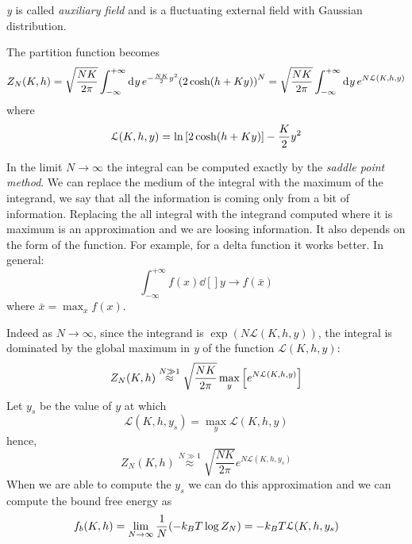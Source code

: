 \documentclass[../main/main.tex]{subfiles}
\begin{document}
\begin{remark}
\emph{y} is called \emph{auxiliary field} and is a fluctuating external field  with Gaussian distribution.
\end{remark}
The partition function becomes
\begin{equation}
Z_N (K,h) = \sqrt{\frac{N K}{2 \pi }} \int_{- \infty }^{+ \infty } \dd[]{y} e^{- \frac{NK}{2}y^2} \qty(2 \cosh(h+Ky))^N = \sqrt{\frac{N K}{2 \pi }} \int_{-\infty }^{+\infty } \dd[]{y} e^{N \mathcal{L} (K,h,y)}
\end{equation}
where
\begin{equation}
  \mathcal{L} (K,h,y) = \ln{\qty[2 \cosh(h+Ky)] } - \frac{K}{2}y^2
\end{equation}

\begin{remark}
In the limit \( N \rightarrow \infty  \) the integral can be computed exactly by the \emph{saddle point method}.
We can replace the medium of the integral with the maximum of the integrand, we say that all the information is coming only from a bit of information. Replacing the all integral with the integrand computed where it is maximum is an approximation and we are loosing information.  It also depends on the form of the function. For example, for a delta function it works better. In general:
\begin{equation*}
  \int_{-\infty }^{+ \infty } f(x) \dd[]{y} \rightarrow f(\bar{x} )
\end{equation*}
where \( \bar{x} = \max_{x} f(x)  \).
\end{remark}


Indeed as \( N \rightarrow \infty  \), since the integrand is \( \exp (N \mathcal{L} (K,h,y))  \), the integral is dominated by the global maximum in \emph{y} of the function \( \mathcal{L} (K,h,y) \):
\begin{equation*}
  Z_N (K,h) \overset{N \gg1 }{\approx}  \sqrt{\frac{N K}{2 \pi }} \max_y \qty[e ^{N \mathcal{L}(K,h,y) } ]
\end{equation*}
Let \( y_s \) be the value of \( y \) at which
\begin{equation*}
  \mathcal{L} (K,h,y_s) = \max_y \mathcal{L} (K,h,y)
\end{equation*}
hence,
\begin{equation}
  Z_N (K,h) \overset{N \gg1 }{\approx} \sqrt{\frac{N K}{2 \pi }} e^{N \mathcal{L} (K,h,y_s)}
\end{equation}
When we are able to compute the \( y_s \) we can do this approximation and we can compute the bound free energy as 
\begin{equation}
  f_b (K,h)= \lim_{N \rightarrow \infty } \frac{1}{N} \qty(- k_B T \log{Z_N}) = -k_B T \mathcal{L} (K,h,y_s)
\end{equation}
\end{document}

